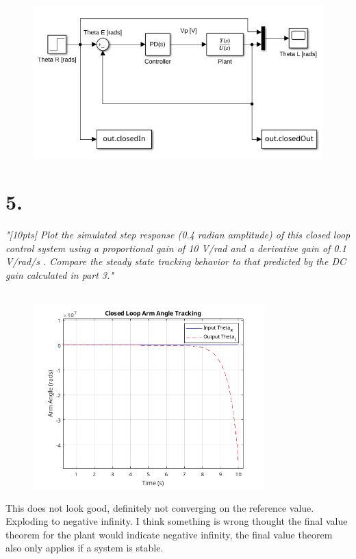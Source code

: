 \documentclass{article}
\begin{document}
\begin{figure}[H]
    \centering
    \includegraphics[width=\textwidth]{closedModel.png}
\end{figure}

\section*{5.}

\textit{
    "[10pts] Plot the simulated step response (0.4 radian amplitude) of this closed loop control
    system using a proportional gain of 10 V/rad and a derivative gain of 0.1 V/rad/s . Compare the
    steady state tracking behavior to that predicted by the DC gain calculated in part 3."
}
\\
\\
\begin{figure}[H]
    \centering
    \includegraphics[width=0.8\textwidth]{closedLoopStepPlot.png}
\end{figure}

This does not look good, definitely not converging on the reference value.
Exploding to negative infinity.
I think something is wrong thought the final value theorem for the plant would indicate negative infinity, the final value theorem also only applies if a system is stable.
\end{document}
